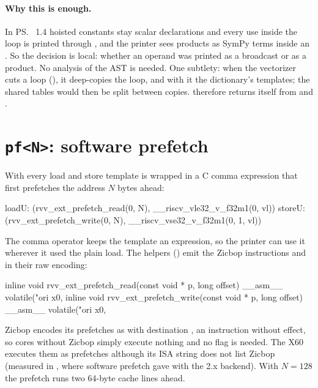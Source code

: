 \paragraph{Why this is enough.} In \ps{}~1.4 hoisted constants stay scalar declarations
and every use inside the loop is printed through , and the printer
sees products as SymPy  terms inside an . So the decision is local:
whether an operand was printed as a broadcast or as a product. No analysis of the AST is
needed. One subtlety: when the vectorizer cuts a loop (), it deep-copies the
loop, and with it the dictionary's templates; the shared tables would then be split
between copies.  therefore returns itself from  and
.

\section{\texttt{pf<N>}: software prefetch}\label{r04:sec:ext-pf}

With  every load and store template is wrapped in a C comma expression that
first prefetches the address $N$ bytes ahead:
\begin{plaincode}
loadU:   (rvv_ext_prefetch_read({0}, N), __riscv_vle32_v_f32m1({0}, vl))
storeU:  (rvv_ext_prefetch_write({0}, N), __riscv_vse32_v_f32m1({0}, {1}, vl))
\end{plaincode}
The comma operator keeps the template an expression, so the printer can use it wherever
it used the plain load. The helpers () emit the Zicbop
instructions  and ~\cite{riscv-cmo} in their raw
encoding:
\begin{ccode}
inline void rvv_ext_prefetch_read(const void * p, long offset)
{
   __asm__ volatile("ori x0, %
}
inline void rvv_ext_prefetch_write(const void * p, long offset)
{
   __asm__ volatile("ori x0, %
}
\end{ccode}
Zicbop encodes its prefetches as  with destination , an instruction
without effect, so cores without Zicbop simply execute nothing and no  flag
is needed. The X60 executes them as prefetches although its ISA string does not list
Zicbop (measured in , where software prefetch gave  with
the 2.x backend). With $N = 128$ the prefetch runs two 64-byte cache lines ahead.

